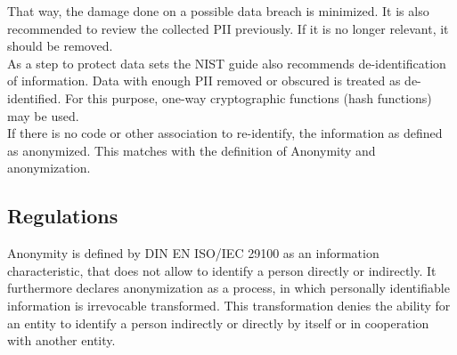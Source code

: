         That way, the damage done on a possible data breach is minimized. It is also recommended to review the collected PII previously. If it is no longer relevant, it should be removed\cite{mccallister_guide_2010}.\\
        As a step to protect data sets the NIST guide also recommends de-identification of information. Data with enough PII removed or obscured is treated as de-identified. For this purpose, one-way cryptographic functions (hash functions) may be used\cite{mccallister_guide_2010}.\\
        If there is no code or other association to re-identify, the information as defined as anonymized\cite{mccallister_guide_2010}. This matches with the definition of Anonymity and anonymization.


    \newpage
    \subsection{Regulations}
        \label{subsec:related:law}
        Anonymity is defined by DIN EN ISO/IEC 29100 as an information characteristic, that does not allow to identify a person directly or indirectly\cite{german_institute_for_standardization_din_2020}. It furthermore declares anonymization as a process, in which personally identifiable information is irrevocable transformed. This transformation denies the ability for an entity to identify a person indirectly or directly by itself or in cooperation with another entity\cite{german_institute_for_standardization_din_2020}.\\
        

